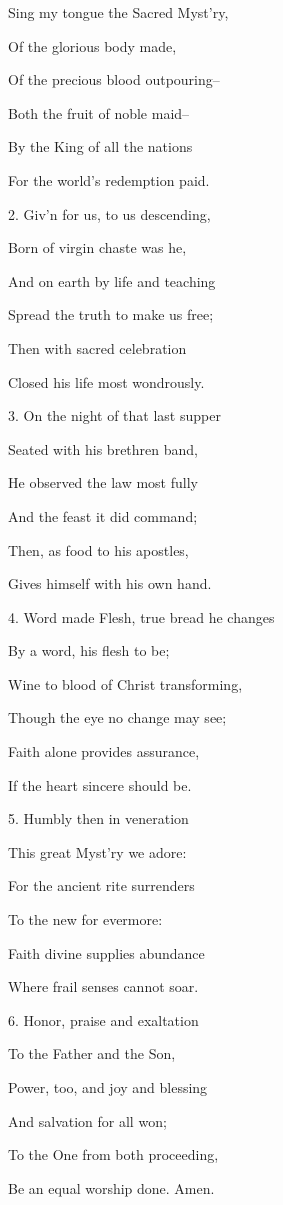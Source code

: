 Sing my tongue the Sacred Myst'ry,

\noindent Of the glorious body made,

\noindent Of the precious blood outpouring--

\noindent Both the fruit of noble maid--

\noindent By the King of all the nations

\noindent For the world's redemption paid.

\noindent 

2. Giv'n for us, to us descending,

\noindent Born of virgin chaste was he,

\noindent And on earth by life and teaching

\noindent Spread the truth to make us free;

\noindent Then with sacred celebration

\noindent Closed his life most wondrously.

\noindent 

3. On the night of that last supper

\noindent Seated with his brethren band,

\noindent He observed the law most fully

\noindent And the feast it did command;

\noindent Then, as food to his apostles,

\noindent Gives himself with his own hand.

\noindent 

4. Word made Flesh, true bread he changes

\noindent By a word, his flesh to be;

\noindent Wine to blood of Christ transforming,

\noindent Though the eye no change may see;

\noindent Faith alone provides assurance,

\noindent If the heart sincere should be.

\noindent 

5. Humbly then in veneration

\noindent This great Myst'ry we adore:

\noindent For the ancient rite surrenders

\noindent To the new for evermore:

\noindent Faith divine supplies abundance

\noindent Where frail senses cannot soar.

\noindent 

6. Honor, praise and exaltation

\noindent To the Father and the Son,

\noindent Power, too, and joy and blessing

\noindent And salvation for all won;

\noindent To the One from both proceeding,

\noindent Be an equal worship done. Amen.
